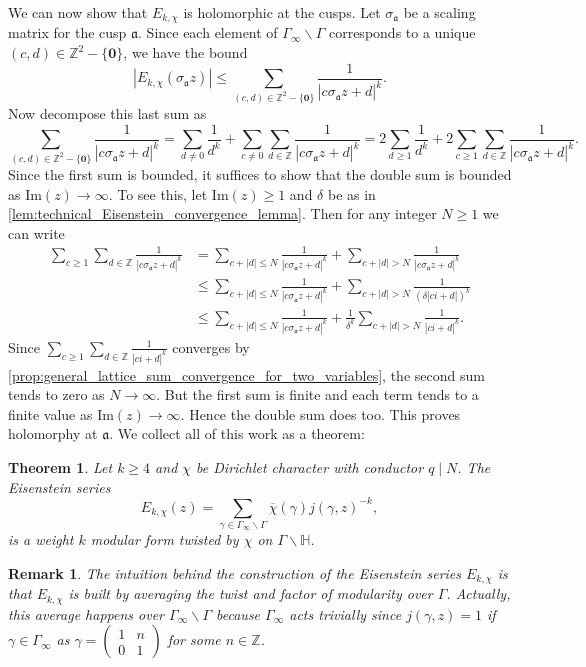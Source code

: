 \documentclass[12pt]{book}
\newtheorem{theorem}{Theorem}[section]
\newtheorem{remark}{Remark}[section]
\theoremstyle{definition}\newframedtheorem{method}{Method}
\newcommand{\mf}{\mathfrak}
\newcommand{\Z}{\mathbb{Z}}
\renewcommand{\H}{\mathbb{H}}
\newcommand{\g}{\gamma}
\renewcommand{\d}{\delta}
\newcommand{\s}{\sigma}
\newcommand{\G}{\Gamma}
\newcommand{\<}{\langle}
\renewcommand{\>}{\rangle}
\newcommand{\conj}{\overline}
\newcommand{\cchi}{\conj{\chi}}
\renewcommand{\Im}{\mathrm{Im}}
\newcommand{\GH}{\G\backslash\H}
\newcommand{\GG}{\G_{\infty}\backslash\G}
\begin{document}
      We can now show that $E_{k,\chi}$ is holomorphic at the cusps. Let $\s_{\mf{a}}$ be a scaling matrix for the cusp $\mf{a}$. Since each element of $\GG$ corresponds to a unique $(c,d) \in \Z^{2}-\{\mathbf{0}\}$, we have the bound
      \[
        |E_{k,\chi}(\s_{\mf{a}}z)| \le \sum_{(c,d) \in \Z^{2}-\{\mathbf{0}\}}\frac{1}{|c\s_{\mf{a}}z+d|^{k}}.
      \]
      Now decompose this last sum as
      \[
        \sum_{(c,d) \in \Z^{2}-\{\mathbf{0}\}}\frac{1}{|c\s_{\mf{a}}z+d|^{k}} = \sum_{d \neq 0}\frac{1}{d^{k}}+\sum_{c \neq 0}\sum_{d \in \Z}\frac{1}{|c\s_{\mf{a}}z+d|^{k}} = 2\sum_{d \ge 1}\frac{1}{d^{k}}+2\sum_{c \ge 1}\sum_{d \in \Z}\frac{1}{|c\s_{\mf{a}}z+d|^{k}}.
      \]
      Since the first sum is bounded, it suffices to show that the double sum is bounded as $\Im(z) \to \infty$. To see this, let $\Im(z) \ge 1$ and $\d$ be as in \cref{lem:technical_Eisenstein_convergence_lemma}. Then for any integer $N \ge 1$ we can write
      \begin{align*}
        \sum_{c \ge 1}\sum_{d \in \Z}\frac{1}{|c\s_{\mf{a}}z+d|^{k}} &= \sum_{c+|d| \le N}\frac{1}{|c\s_{\mf{a}}z+d|^{k}}+\sum_{c+|d| > N}\frac{1}{|c\s_{\mf{a}}z+d|^{k}} \\
        &\le \sum_{c+|d| \le N}\frac{1}{|c\s_{\mf{a}}z+d|^{k}}+\sum_{c+|d| > N}\frac{1}{(\d|ci+d|)^{k}} \\
        &\le \sum_{c+|d| \le N}\frac{1}{|c\s_{\mf{a}}z+d|^{k}}+\frac{1}{\d^{k}}\sum_{c+|d| > N}\frac{1}{|ci+d|^{k}}.
      \end{align*}
      Since $\sum_{c \ge 1}\sum_{d \in \Z}\frac{1}{|ci+d|^{k}}$ converges by \cref{prop:general_lattice_sum_convergence_for_two_variables}, the second sum tends to zero as $N \to \infty$. But the first sum is finite and each term tends to a finite value as $\Im(z) \to \infty$. Hence the double sum does too. This proves holomorphy at $\mf{a}$. We collect all of this work as a theorem:

      \begin{theorem}
        Let $k \ge 4$ and $\chi$ be Dirichlet character with conductor $q \mid N$. The Eisenstein series
        \[
          E_{k,\chi}(z) = \sum_{\g \in \GG}\cchi(\g)j(\g,z)^{-k},
        \]
        is a weight $k$ modular form twisted by $\chi$ on $\GH$.
      \end{theorem}

      \begin{remark}
        The intuition behind the construction of the Eisenstein series $E_{k,\chi}$ is that $E_{k,\chi}$ is built by averaging the twist and factor of modularity over $\G$. Actually, this average happens over $\GG$ because $\G_{\infty}$ acts trivially since $j(\g,z) = 1$ if $\g \in \G_{\infty}$ as $\g = \begin{pmatrix} 1 & n \\ 0 & 1 \end{pmatrix}$ for some $n \in \Z$.
      \end{remark}
\end{document}
